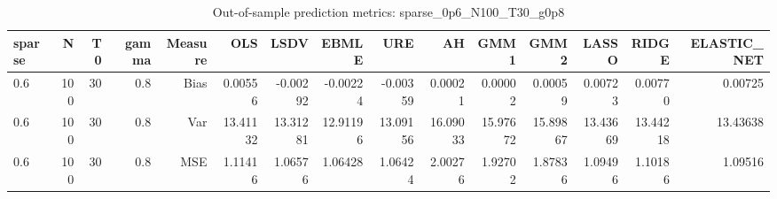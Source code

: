 \begin{table}[!htbp]\centering
\caption{Out-of-sample prediction metrics: sparse_0p6_N100_T30_g0p8}
\label{tab:table3_sparse_0p6_N100_T30_g0p8}
\begin{tabular}{lrrrrrrrrrrrrrr}
\hline
sparse & N & T0 & gamma & Measure & OLS & LSDV & EBMLE & URE & AH & GMM1 & GMM2 & LASSO & RIDGE & ELASTIC_NET \\
\hline
0.6 & 100 & 30 & 0.8 & Bias & 0.00556 & -0.00292 & -0.00224 & -0.00359 & 0.00021 & 0.00002 & 0.00059 & 0.00723 & 0.00770 & 0.00725 \\
0.6 & 100 & 30 & 0.8 & Var & 13.41132 & 13.31281 & 12.91196 & 13.09156 & 16.09033 & 15.97672 & 15.89867 & 13.43669 & 13.44218 & 13.43638 \\
0.6 & 100 & 30 & 0.8 & MSE & 1.11416 & 1.06576 & 1.06428 & 1.06424 & 2.00276 & 1.92702 & 1.87836 & 1.09496 & 1.10186 & 1.09516 \\
\hline
\end{tabular}
\end{table}

